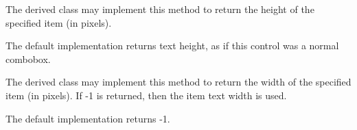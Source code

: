 \label{wxownerdrawncomboboxonmeasureitem}


The derived class may implement this method to return the height of the
specified item (in pixels).

The default implementation returns text height, as if this control was
a normal combobox.


\label{wxownerdrawncomboboxonmeasureitemwidth}


The derived class may implement this method to return the width of the
specified item (in pixels). If -1 is returned, then the item text width
is used.

The default implementation returns -1.

